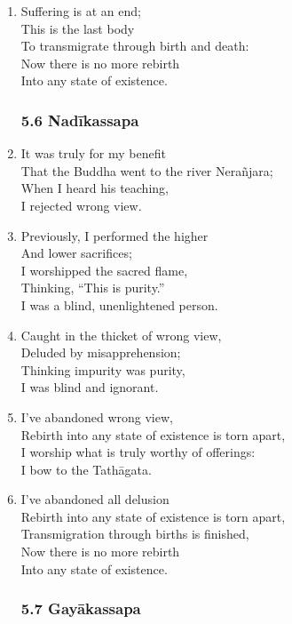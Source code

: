 \documentclass[10pt, openany]{book}
\begin{document}
\begin{enumerate}
\item Suffering is at an end;\\
This is the last body\\
To transmigrate through birth and death:\\
Now there is no more rebirth \\
Into any state of existence.

\subsubsection*{5.6 Nadīkassapa}

\item It was truly for my benefit\\
That the Buddha went to the river Nerañjara;\\
When I heard his teaching,\\
I rejected wrong view.

\item Previously, I performed the higher \\
And lower sacrifices;\\
I worshipped the sacred flame,\\
Thinking, “This is purity.”\\
I was a blind, unenlightened person.

\item Caught in the thicket of wrong view,\\
Deluded by misapprehension;\\
Thinking impurity was purity,\\
I was blind and ignorant.

\item I’ve abandoned wrong view,\\
Rebirth into any state of existence is torn apart,\\
I worship what is truly worthy of offerings:\\
I bow to the Tathāgata.

\item I’ve abandoned all delusion \\
Rebirth into any state of existence is torn apart,\\
Transmigration through births is finished,\\
Now there is no more rebirth \\
Into any state of existence.

\subsubsection*{5.7 Gayākassapa}


\end{enumerate}
\end{document}
